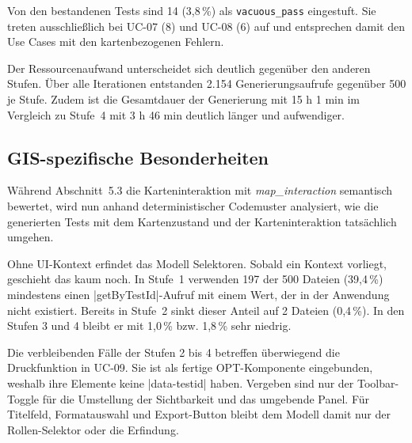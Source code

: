 Von den bestandenen Tests sind 14 (3,8\,\%) als \texttt{vacuous\_pass} eingestuft. Sie treten ausschließlich bei UC-07 (8) und UC-08 (6) auf und entsprechen damit den Use Cases mit den kartenbezogenen Fehlern.

Der Ressourcenaufwand unterscheidet sich deutlich gegenüber den anderen Stufen. Über alle Iterationen entstanden 2.154 Generierungsaufrufe gegenüber 500 je Stufe. Zudem ist die Gesamtdauer der Generierung mit 15 h 1 min im Vergleich zu Stufe~4 mit 3 h 46 min deutlich länger und aufwendiger.

\subsection{GIS-spezifische Besonderheiten}

Während Abschnitt~5.3 die Karteninteraktion mit \emph{map\_interaction} semantisch bewertet, wird nun anhand deterministischer Codemuster analysiert, wie die generierten Tests mit dem Kartenzustand und der Karteninteraktion tatsächlich umgehen.

Ohne \ac{UI}-Kontext erfindet das Modell Selektoren. Sobald ein Kontext vorliegt, geschieht das kaum noch. In Stufe~1 verwenden 197 der 500 Dateien (39,4\,\%) mindestens einen \code|getByTestId|-Aufruf mit einem Wert, der in der Anwendung nicht existiert. Bereits in Stufe~2 sinkt dieser Anteil auf 2 Dateien (0,4\,\%). In den Stufen 3 und 4 bleibt er mit 1,0\,\% bzw. 1,8\,\% sehr niedrig.

Die verbleibenden Fälle der Stufen 2 bis 4 betreffen überwiegend die Druckfunktion in UC-09. Sie ist als fertige \ac{OPT}-Komponente eingebunden, weshalb ihre Elemente keine \code|data-testid| haben. Vergeben sind nur der Toolbar-Toggle für die Umstellung der Sichtbarkeit und das umgebende Panel. Für Titelfeld, Formatauswahl und Export-Button bleibt dem Modell damit nur der Rollen-Selektor oder die Erfindung.

